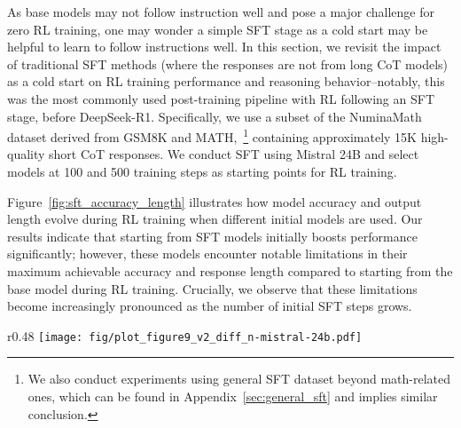 \documentclass{article} %
\begin{document}
As base models may not follow instruction well and pose a major challenge for zero RL training, one may wonder a simple SFT stage as a cold start may be helpful to learn to follow instructions well. In this section, we revisit the impact of traditional SFT methods (where the responses are not from long CoT models) as a cold start on RL training performance and reasoning behavior--notably, this was the most commonly used post-training pipeline with RL following an SFT stage, before DeepSeek-R1. Specifically, we use a subset of the NuminaMath~\citep{li2024numinamath} dataset derived from GSM8K and MATH,~\footnote{We also conduct experiments using general SFT dataset beyond math-related ones, which can be found in Appendix~\ref{sec:general_sft} and implies similar conclusion.} containing approximately 15K high-quality short CoT responses. We conduct SFT using Mistral 24B and select models at 100 and 500 training steps as starting points for RL training. 

Figure~\ref{fig:sft_accuracy_length} illustrates how model accuracy and output length evolve during RL training when different initial models are used. Our results indicate that starting from SFT models initially boosts performance significantly; however, these models encounter notable limitations in their maximum achievable accuracy and response length compared to starting from the base model during RL training. Crucially, we observe that these limitations become increasingly pronounced as the number of initial SFT steps grows.


\begin{wrapfigure}{r}{0.48\columnwidth}
    \centering
    \texttt{[image: fig/plot\_figure9\_v2\_diff\_n-mistral-24b.pdf]}
    \caption{Accuracy and response length averaged on the six benchmarks over RL training iterations after running different SFT steps as starting points. }
    \label{fig:sft_accuracy_length} 
\end{wrapfigure}
\end{document}
